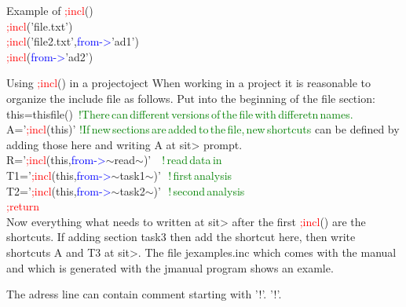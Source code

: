\begin{example}[inpuincl]Example of \textcolor{Red}{;incl}()\\
\label{inpuincl}
 \textcolor{Red}{;incl}('file.txt')\\
 \textcolor{Red}{;incl}('file2.txt',\textcolor{blue}{from->}'ad1')\\
 \textcolor{Red}{;incl}(\textcolor{blue}{from->}'ad2')
\end{example}
\begin{note}
Using \textcolor{Red}{;incl}() in a projectoject
When working in a project it is reasonable to organize
the include file as follows. Put into the beginning of the file section:\\
this=\textcolor{VioletRed}{thisfile}() \,\textcolor{green}{!There\,can\,different\,versions\,of\,the\,file\,with\,differetn\,names.\\}
A='\textcolor{Red}{;incl}(this)' \textcolor{green}{!If\,new\,sections\,are\,added\,to\,the\,file,\,new\,shortcuts}
can be defined by adding those here and writing A at sit> prompt.\\
R='\textcolor{Red}{;incl}(this,\textcolor{blue}{from->}$\sim$read$\sim$)' \,\,\,\,\textcolor{green}{!\,read\,data\,in\,\\}
T1='\textcolor{Red}{;incl}(this,\textcolor{blue}{from->}$\sim$task1$\sim$)' \,\,\textcolor{green}{!\,first\,analysis\,\\}
T2='\textcolor{Red}{;incl}(this,\textcolor{blue}{from->}$\sim$task2$\sim$)' \,\,\textcolor{green}{!\,second\,analysis\,\\}
\textcolor{Red}{;return} \\
Now everything what needs to written at sit> after the first
\textcolor{Red}{;incl}() are the shortcuts. If adding section task3 then
add the shortcut here, then write shortcuts A and T3 at sit>.
The file jexamples.inc which comes with the manual and which is generated
 with the jmanual program shows an examle.
\end{note}
\begin{note}
The adress line can contain comment starting with '!'. '!'.
\end{note}
